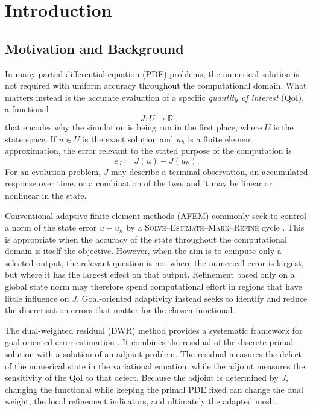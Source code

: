 \chapter{Introduction}
\label{chap:introduction}

\section{Motivation and Background}
\label{sec:introduction-background}

In many partial differential equation (PDE) problems, the numerical solution is not required with uniform accuracy throughout the computational domain. What matters instead is the accurate evaluation of a specific \emph{quantity of interest} (QoI), a functional  
\begin{equation}
  J:U\longrightarrow\mathbb R
  \label{eq:intro-qoi-map}
\end{equation}
that encodes why the simulation is being run in the first place, where $U$ is the state space. If $u\in U$ is the exact solution and $u_h$ is a finite element approximation, the error relevant to the stated purpose of the computation is
\begin{equation}
  e_J\coloneqq J(u)-J(u_h).
  \label{eq:intro-goal-error}
\end{equation}
For an evolution problem, $J$ may describe a terminal observation, an accumulated response over time, or a combination of the two, and it may be linear or nonlinear in the state.

Conventional adaptive finite element methods (AFEM) commonly seek to control a norm of the state error $u-u_h$ by a \textsc{Solve--Estimate--Mark--Refine} cycle \cite{pioneer,Ainsworth_Oden_1997,Eriksson_Estep_Hansbo_Johnson_1995,MorinNochettoSiebert2002,carstensen2014axioms}. This is appropriate when the accuracy of the state throughout the computational domain is itself the objective. However, when the aim is to compute only a selected output, the relevant question is not where the numerical error is largest, but where it has the largest effect on that output. Refinement based only on a global state norm may therefore spend computational effort in regions that have little influence on $J$. Goal-oriented adaptivity instead seeks to identify and reduce the discretisation errors that matter for the chosen functional.

The dual-weighted residual (DWR) method provides a systematic framework for goal-oriented error estimation \cite{Becker_Rannacher_2001,Bangerth_Rannacher_2003}. It combines the residual of the discrete primal solution with a solution of an adjoint problem. The residual measures the defect of the numerical state in the variational equation, while the adjoint measures the sensitivity of the QoI to that defect. Because the adjoint is determined by $J$, changing the functional while keeping the primal PDE fixed can change the dual weight, the local refinement indicators, and ultimately the adapted mesh.

